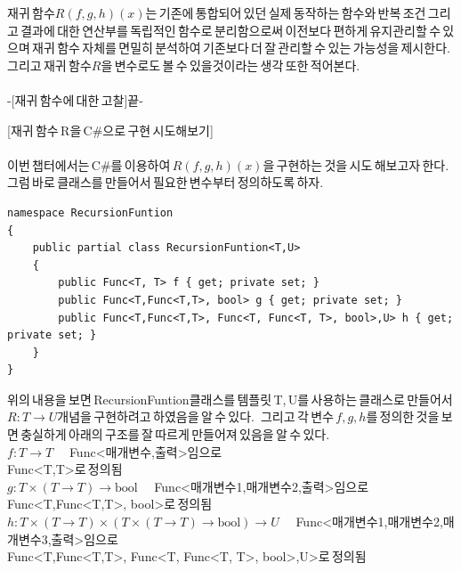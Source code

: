 \documentclass{article}
\begin{document}
재귀\,함수$R(f,g,h)(x)$는\,기존에\,통합되어\,있던\,실제\,동작하는\,함수와\,반복\,조건\,그리고\,결과에\,대한\,연산부를\,독립적인\,함수로\,분리함으로써\,이전보다\,편하게\,유지관리할\,수\,있으며\,재귀\,함수\,자체를\,면밀히\,분석하여\,기존보다\,더\,잘\,관리할\,수\,있는\,가능성을\,제시한다.\,
그리고\,재귀\,함수$R$을\,변수로도\,볼\,수\,있을것이라는\,생각\,또한\,적어본다.\\
\\
-[재귀\,함수에\,대한\,고찰]끝-
\newline
\newline
\newline
\newline

[재귀\,함수\,R을\,C\#으로\,구현\,시도해보기]
\\\\
이번\,챕터에서는\,C\#를\,이용하여\,$R(f,g,h)(x)$을\,구현하는\,것을\,시도\,해보고자\,한다.\,
그럼\,바로\,클래스를\,만들어서\,필요한\,변수부터\,정의하도록\,하자.
\\
\newline
\begin{lstlisting}[caption={재귀\,함수\,R의\,기본\,매개변수\,$f,g,h$에\,대한\,정의부}]
namespace RecursionFuntion
{
    public partial class RecursionFuntion<T,U>
    {
        public Func<T, T> f { get; private set; }
        public Func<T,Func<T,T>, bool> g { get; private set; }
        public Func<T,Func<T,T>, Func<T, Func<T, T>, bool>,U> h { get; private set; }
    }
}
\end{lstlisting}

위의\,내용을\,보면\,RecursionFuntion클래스를\,템플릿\,T,\,U를\,사용하는\,클래스로\,만들어서\,$R:T \rightarrow U$개념을\,구현하려고\,하였음을\,알\,수\,있다.\,
그리고\,각\,변수\,$f,g,h$를\,정의한\,것을\,보면\,충실하게\,아래의\,구조를\,잘\,따르게\,만들어져\,있음을\,알\,수\,있다.\\
\newline
$f:T \rightarrow T$ \,\,\,\, Func<매개변수,출력>임으로\\Func<T,T>로\,정의됨 \\
\newline
$g:T \times (T \rightarrow T) \rightarrow \text{bool}$ \,\,\,\,  Func<매개변수1,매개변수2,출력>임으로\\Func<T,Func<T,T>, bool>로\,정의됨 \\
\newline
$h:T \times (T \rightarrow T) \times (T \times (T \rightarrow T) \rightarrow \text{bool}) \rightarrow U$ \,\,\,\, Func<매개변수1,매개변수2,매개변수3,출력>임으로\\Func<T,Func<T,T>, Func<T, Func<T, T>, bool>,U>로\,정의됨 \\
\newline
\end{document}
